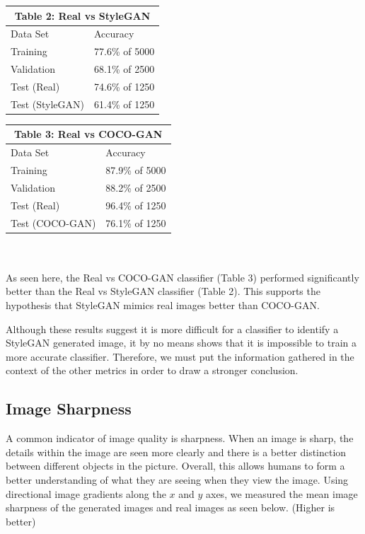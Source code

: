 \documentclass[10pt]{article}
\begin{document}
\begin{multicols*}{2}
        \begin{tabular}{ |p{4cm}|p{3cm}|  }
             \hline
             \multicolumn{2}{|c|}{Table 2: Real vs StyleGAN} \\
             \hline
            Data Set     & Accuracy\\
             \hline
            Training        & 77.6\% of 5000 \\
             \hline
            Validation      & 68.1\% of 2500 \\
             \hline
            Test (Real)     & 74.6\% of 1250 \\
             \hline
            Test (StyleGAN) & 61.4\% of 1250  \\
             \hline
        \end{tabular}

        \begin{tabular}{ |p{4cm}|p{3cm}|  }
             \hline
             \multicolumn{2}{|c|}{Table 3: Real vs COCO-GAN} \\
             \hline
            Data Set     & Accuracy\\
             \hline
            Training        & 87.9\% of 5000 \\
             \hline
            Validation      & 88.2\% of 2500 \\
             \hline
            Test (Real)     & 96.4\% of 1250 \\
             \hline
            Test (COCO-GAN) & 76.1\% of 1250 \\
             \hline
        \end{tabular}
        \\\\
        As seen here, the Real vs COCO-GAN classifier (Table 3) performed significantly better than the Real vs StyleGAN classifier (Table 2).
        This supports the hypothesis that StyleGAN mimics real images better than COCO-GAN.

        Although these results suggest it is more difficult for a classifier to identify a StyleGAN generated image, it by no means shows that it is impossible to train a more accurate classifier.
        Therefore, we must put the information gathered in the context of the other metrics in order to draw a stronger conclusion.

        \subsection{Image Sharpness}
        \label{subsec:imageSharpness}
        A common indicator of image quality is sharpness.
        When an image is sharp, the details within the image are seen more clearly and there is a better distinction between different objects in the picture.
        Overall, this allows humans to form a better understanding of what they are seeing when they view the image.
        Using directional image gradients along the $x$ and $y$ axes, we measured the mean image sharpness of the generated images and real images as seen below. (Higher is better)\\


\end{multicols*}
\end{document}
